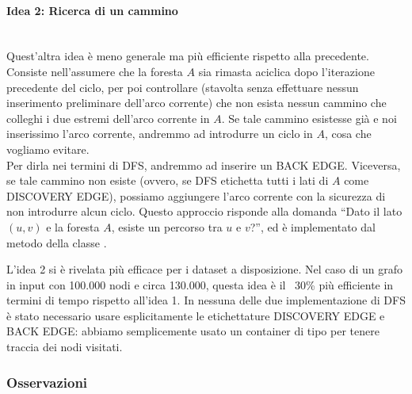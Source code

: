 \paragraph{Idea 2: Ricerca di un cammino}\mbox{} \\

\noindent Quest'altra idea è meno generale ma più efficiente rispetto alla precedente. Consiste nell'assumere che la foresta $A$ sia rimasta aciclica dopo l'iterazione precedente del ciclo, per poi controllare (stavolta senza effettuare nessun inserimento preliminare dell'arco corrente) che non esista nessun cammino che colleghi i due estremi dell'arco corrente in $A$.
Se tale cammino esistesse già e noi inserissimo l'arco corrente, andremmo ad introdurre un ciclo in $A$, cosa che vogliamo evitare.\\
Per dirla nei termini di DFS, andremmo ad inserire un BACK EDGE. Viceversa, se tale cammino non esiste (ovvero, se DFS etichetta tutti i lati di $A$ come DISCOVERY EDGE), possiamo aggiungere l'arco corrente con la sicurezza di non introdurre alcun ciclo.
Questo approccio risponde alla domanda ``Dato il lato $(u, v)$ e la foresta $A$, esiste un percorso tra $u$ e $v$?'', ed è implementato dal metodo  della classe . \\

\vspace{0.5cm}

\noindent L'idea 2 si è rivelata più efficace per i dataset a disposizione. Nel caso di un grafo in input con 100.000 nodi e circa 130.000, questa idea è il ~30\% più efficiente in termini di tempo rispetto all'idea 1. In nessuna delle due implementazione di DFS è stato necessario usare esplicitamente le etichettature DISCOVERY EDGE e BACK EDGE: abbiamo semplicemente usato un container di tipo  per tenere traccia dei nodi visitati.

\subsubsection{Osservazioni}

